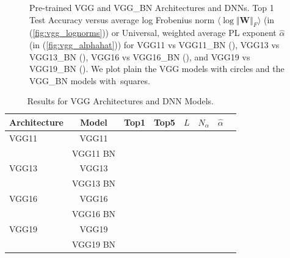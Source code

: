 \begin{figure}[t]
{      \label{fig:vgg_alphahat}
   }
   \caption{%
      Pre-trained VGG and VGG\_BN Architectures and DNNs.  
      Top 1 Test Accuracy versus
      average log Frobenius norm $\langle\log\Vert\mathbf{W}\Vert_{F}\rangle$ (in (\ref{fig:vgg_lognorms}))
      or
      Universal, weighted average PL exponent $\hat{\alpha}$ (in (\ref{fig:vgg_alphahat}))
      for
      VGG11 vs VGG11\_BN ({\color{blue}{blue}}),
      VGG13 vs VGG13\_BN ({\color{orange}{orange}}),
      VGG16 vs VGG16\_BN ({\color{green}{green}}),  and
      VGG19 vs VGG19\_BN ({\color{red}{red}}). 
      We plot plain the VGG models with circles and the VGG\_BN models with~squares.
   }
   \label{fig:vgg}
\end{figure}





\begin{table}[t]
\small
\begin{center}
\begin{tabular}{|p{0.75in}|c|c|c|c|c|c|c|}
\hline
Architecture 
 & Model &Top1 
 & Top5 & $L$ & $N_{\alpha}$ & $\hat{\alpha}$ \\
\hline
VGG11 & VGG11 & & & & & \\
  & VGG11 BN & & & & & \\
\hline
VGG13 & VGG13 & & & & & \\
  & VGG13 BN & & & & & \\
\hline
VGG16 & VGG16 & & & & & \\
  & VGG16 BN & & & & & \\
\hline
VGG19 & VGG19 & & & & & \\
  & VGG19 BN & & & & & \\
\hline
\end{tabular}
\end{center}
\caption{%
         Results for VGG Architectures and DNN Models.
         }
\label{table:models_VGG}
\end{table}


